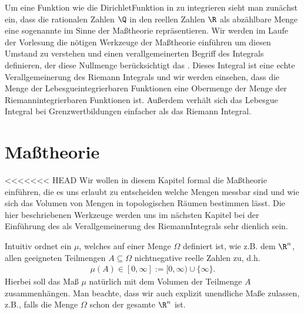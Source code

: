 \documentclass[letterpaper,10pt,english]{jupyterBook}
\begin{document}
\sphinxAtStartPar
Um eine Funktion wie die Dirichlet\sphinxhyphen{}Funktion in {\hyperref[\detokenize{masstheorie/intro_masstheorie:ex:dirichletFunktion}]{}} zu integrieren sieht man zunächst ein, dass die rationalen Zahlen \(\Q\) in den reellen Zahlen \(\R\) als abzählbare Menge eine sogenannte  im Sinne der Maßtheorie repräsentieren.
Wir werden im Laufe der Vorlesung die nötigen Werkzeuge der Maßtheorie einführen um diesen Umstand zu verstehen und einen verallgemeinerten Begriff des Integrals definieren, der diese Nullmenge berücksichtigt \sphinxhyphen{} das .
Dieses Integral ist eine echte Verallgemeinerung des Riemann Integrals und wir werden einsehen, dass die Menge der Lebesgue\sphinxhyphen{}integrierbaren Funktionen eine Obermenge der Menge der Riemann\sphinxhyphen{}integrierbaren Funktionen ist.
Außerdem verhält sich das Lebesgue Integral bei Grenzwertbildungen einfacher als das Riemann Integral.


\section{Maßtheorie}
\label{\detokenize{masstheorie/masstheorie:masztheorie}}\label{\detokenize{masstheorie/masstheorie::doc}}
\sphinxAtStartPar
<<<<<<< HEAD
Wir wollen in diesem Kapitel formal die Maßtheorie einführen, die es uns erlaubt zu entscheiden welche Mengen messbar sind und wie sich das Volumen von Mengen in topologischen Räumen bestimmen lässt.
Die hier beschriebenen Werkzeuge werden uns im nächsten Kapitel bei der Einführung des  als Verallgemeinerung des Riemann\sphinxhyphen{}Integrals sehr dienlich sein.

\sphinxAtStartPar
Intuitiv ordnet ein  \(\mu\), welches auf einer Menge \(\Omega\) definiert ist, wie z.B. dem \(\R^n\), allen geeigneten Teilmengen \(A\subseteq \Omega\) nichtnegative reelle Zahlen zu, d.h.
\begin{equation*}
\begin{split}\mu(A)\in[0,\infty] := [0,\infty)\cup\{\infty\}.\end{split}
\end{equation*}
\sphinxAtStartPar
Hierbei soll das Maß \(\mu\) natürlich mit dem Volumen der Teilmenge \(A\) zusammenhängen.
Man beachte, dass wir auch explizit unendliche Maße zulassen, z.B., falls die Menge \(\Omega\) schon der gesamte \(\R^n\) ist.
\end{document}
